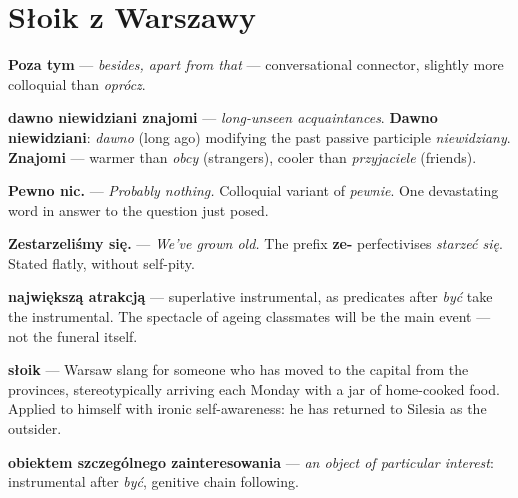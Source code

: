 \section{Słoik z Warszawy}


\textbf{Poza tym} --- \textit{besides, apart from that} --- conversational 
connector, slightly more colloquial than \textit{oprócz}.

\textbf{dawno niewidziani znajomi} --- \textit{long-unseen acquaintances}. 
\textbf{Dawno niewidziani}: \textit{dawno} (long ago) modifying the past 
passive participle \textit{niewidziany}. \textbf{Znajomi} --- warmer than 
\textit{obcy} (strangers), cooler than \textit{przyjaciele} (friends).

\textbf{Pewno nic.} --- \textit{Probably nothing.} Colloquial variant of 
\textit{pewnie}. One devastating word in answer to the question just posed.

\textbf{Zestarzeliśmy się.} --- \textit{We've grown old.} The prefix \textbf{ze-} 
perfectivises \textit{starzeć się}. Stated flatly, without self-pity.

\textbf{największą atrakcją} --- superlative instrumental, as predicates after 
\textit{być} take the instrumental. The spectacle of ageing classmates will 
be the main event --- not the funeral itself.



\textbf{słoik} --- Warsaw slang for someone who has moved to the capital from 
the provinces, stereotypically arriving each Monday with a jar of home-cooked 
food. Applied to himself with ironic self-awareness: he has returned to Silesia 
as the outsider.

\textbf{obiektem szczególnego zainteresowania} --- \textit{an object of particular 
interest}: instrumental after \textit{być}, genitive chain following.


